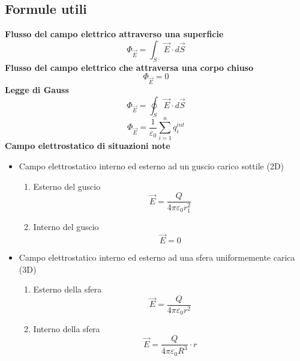 \documentclass[twoside]{article}
\begin{document}
\subsection{Formule utili}
\textbf{Flusso del campo elettrico attraverso una superficie}
\begin{equation}
    \boxed{\Phi_{\vec{E}} = \displaystyle \int_{S} \vec{E} \cdot d\vec{S}}
\end{equation}
\textbf{Flusso del campo elettrico che attraversa una corpo chiuso}
\begin{equation}
    \boxed{\Phi_{\vec{E}} = 0}
\end{equation}
\textbf{Legge di Gauss}
\begin{equation}
    \boxed{\Phi_{\vec{E}} = \displaystyle \oint_S \vec{E} \cdot d\vec{S}}
\end{equation}
\begin{equation}
    \boxed{\Phi_{\vec{E}} = \displaystyle \frac{1}{\varepsilon_0} \sum_{i=1}^{n} q_{i}^{int}}
\end{equation}
\textbf{Campo elettrostatico di situazioni note}
\begin{itemize}
    \item Campo elettrostatico interno ed esterno ad un guscio carico sottile (2D)
          \begin{enumerate}
              \item Esterno del guscio
                    \begin{equation}
                        \boxed{\vec{E} = \displaystyle \frac{Q}{4\pi \varepsilon_0 r_{1}^2}}
                    \end{equation}
              \item Interno del guscio
                    \begin{equation}
                        \boxed{\vec{E} = 0}
                    \end{equation}
          \end{enumerate}
    \item Campo elettrostatico interno ed esterno ad una sfera uniformemente carica (3D)
          \begin{enumerate}
              \item Esterno della sfera
                    \begin{equation}
                        \boxed{\vec{E} = \displaystyle \frac{Q}{4\pi \varepsilon_0 r^2}}
                    \end{equation}
              \item Interno della sfera
                    \begin{equation}
                        \boxed{\vec{E} = \displaystyle \frac{Q}{4\pi \varepsilon_0 R^3} \cdot r}
                    \end{equation}
          \end{enumerate}
\end{itemize}
\end{document}
